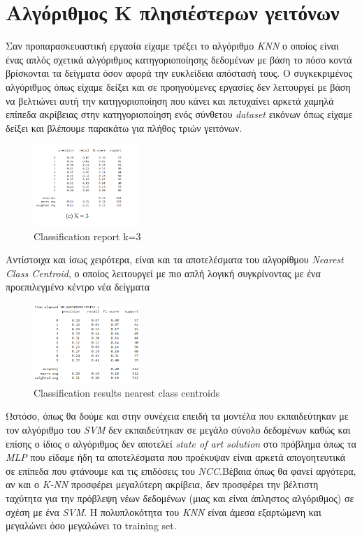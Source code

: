 \documentclass[10pt,a4paper,]{article}
\begin{document}
\section{Αλγόριθμος Κ πλησιέστερων γειτόνων}
Σαν προπαρασκευαστική εργασία είχαμε τρέξει το αλγόριθμο \textit{KNN} ο οποίος είναι ένας απλός σχετικά αλγόριθμος κατηγοριοποίησης δεδομένων με βάση το πόσο κοντά βρίσκονται τα δείγματα όσον αφορά την ευκλείδεια απόστασή τους. Ο συγκεκριμένος αλγόριθμος όπως είχαμε δείξει και σε προηγούμενες εργασίες δεν λειτουργεί με βάση να βελτιώνει αυτή την κατηγοριοποίηση που κάνει και πετυχαίνει αρκετά χαμηλά επίπεδα ακρίβειας στην κατηγοριοποίηση ενός σύνθετου \textit{dataset }εικόνων όπως είχαμε δείξει και βλέπουμε παρακάτω για πλήθος τριών γειτόνων. 
\begin{figure}[!htb]
    \centering
    \includegraphics[width=4cm]{Knn3.png}
    \caption{Classification report k=3}
    \label{fig:knn3}
\end{figure}
\newline
Αντίστοιχα και ίσως χειρότερα, είναι και τα αποτελέσματα του αλγορίθμου \textit{Nearest Class Centroid}, ο οποίος λειτουργεί με πιο απλή λογική συγκρίνοντας με ένα προεπιλεγμένο κέντρο νέα δείγματα
\begin{figure}[!htb]
    \centering
    \includegraphics[width=4cm]{NCC-results.png}
    \caption{Classification results nearest class centroids}
    \label{fig:knn3}
\end{figure}
\newline
Ωστόσο, όπως θα δούμε και στην συνέχεια επειδή τα μοντέλα που εκπαιδεύτηκαν με τον αλγόριθμο του \textit{SVM} δεν εκπαιδεύτηκαν σε μεγάλο σύνολο δεδομένων καθώς και επίσης ο ίδιος ο αλγόριθμος δεν αποτελεί \textit{state of art solution} στο πρόβλημα όπως τα \textit{MLP} που είδαμε ήδη τα αποτελέσματα που προέκυψαν είναι αρκετά απογοητευτικά σε επίπεδα που φτάνουμε και τις επιδόσεις του \textit{NCC}.Βέβαια όπως θα φανεί αργότερα, αν και ο \textit{K-NN} προσφέρει μεγαλύτερη ακρίβεια, δεν προσφέρει την βέλτιστη ταχύτητα για την πρόβλεψη νέων δεδομένων (μιας και είναι άπληστος αλγόριθμος) σε σχέση με  ένα \textit{SVM}. Η πολυπλοκότητα του \textit{KNN} είναι άμεσα εξαρτώμενη και μεγαλώνει όσο μεγαλώνει το training set. 
\end{document}
